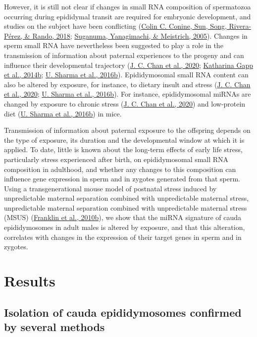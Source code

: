 \documentclass[12pt,twoside]{reedthesis}
\begin{document}
However, it is still not clear if changes in small RNA composition of
spermatozoa occurring during epididymal transit are required for
embryonic development, and studies on the subject have been conflicting
(\protect\hyperlink{ref-conine_2018}{Colin C. Conine, Sun, Song, Rivera-Pérez, \& Rando, 2018}; \protect\hyperlink{ref-suganuma_2005}{Suganuma, Yanagimachi, \& Meistrich, 2005}). Changes in sperm small RNA have
nevertheless been suggested to play a role in the transmission of
information about paternal experiences to the progeny and can influence
their developmental trajectory (\protect\hyperlink{ref-chan_2020}{J. C. Chan et al., 2020}; \protect\hyperlink{ref-gapp_2014}{Katharina Gapp et al., 2014b}; \protect\hyperlink{ref-sharma_2016}{U. Sharma et al., 2016b}).
Epididymosomal small RNA content can also be altered by exposure, for
instance, to dietary insult and stress (\protect\hyperlink{ref-chan_2020}{J. C. Chan et al., 2020}; \protect\hyperlink{ref-sharma_2016}{U. Sharma et al., 2016b}). For
instance, epididymosomal miRNAs are changed by exposure to chronic
stress (\protect\hyperlink{ref-chan_2020}{J. C. Chan et al., 2020}) and low-protein diet (\protect\hyperlink{ref-sharma_2016}{U. Sharma et al., 2016b}) in mice.

Transmission of information about paternal exposure to the offspring
depends on the type of exposure, its duration and the developmental
window at which it is applied. To date, little is known about the
long-term effects of early life stress, particularly stress experienced
after birth, on epididymosomal small RNA composition in adulthood, and
whether any changes to this composition can influence gene expression in
sperm and in zygotes generated from that sperm. Using a
transgenerational mouse model of postnatal stress induced by
unpredictable maternal separation combined with unpredictable maternal
stress, unpredictable maternal separation combined with unpredictable
maternal stress (MSUS) (\protect\hyperlink{ref-franklin_2010}{Franklin et al., 2010b}), we show that the miRNA
signature of cauda epididymosomes in adult males is altered by exposure,
and that this alteration, correlates with changes in the expression of
their target genes in sperm and in zygotes.

\hypertarget{results-1}{%
\section{Results}\label{results-1}}

\hypertarget{isolation-of-cauda-epididymosomes-confirmed-by-several-methods}{%
\subsection{Isolation of cauda epididymosomes confirmed by several methods}\label{isolation-of-cauda-epididymosomes-confirmed-by-several-methods}}
\end{document}
